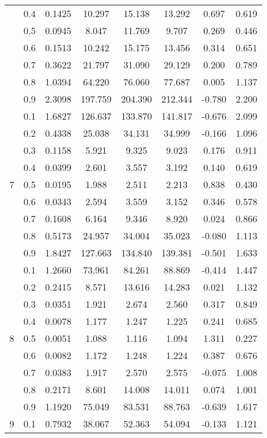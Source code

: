 \documentclass[11pt,a4paper]{report}
\begin{document}
\begin{longtable}{ | c | c || c | c | c | c | c | c | }
 & 0.4 & 0.1425 & 10.297 & 15.138 & 13.292 & 0.697 & 0.619 \\
 & 0.5 & 0.0945 & 8.047 & 11.769 & 9.707 & 0.269 & 0.446 \\
 & 0.6 & 0.1513 & 10.242 & 15.175 & 13.456 & 0.314 & 0.651 \\
 & 0.7 & 0.3622 & 21.797 & 31.090 & 29.129 & 0.200 & 0.789 \\
 & 0.8 & 1.0394 & 64.220 & 76.060 & 77.687 & 0.005 & 1.137 \\
 & 0.9 & 2.3098 & 197.759 & 204.390 & 212.344 & -0.780 & 2.200 \\
 \hline
\multirow{9}{*}{7} & 0.1 & 1.6827 & 126.637 & 133.870 & 141.817 & -0.676 & 2.099 \\
 & 0.2 & 0.4338 & 25.038 & 34.131 & 34.999 & -0.166 & 1.096 \\
 & 0.3 & 0.1158 & 5.921 & 9.325 & 9.023 & 0.176 & 0.911 \\
 & 0.4 & 0.0399 & 2.601 & 3.557 & 3.192 & 0.140 & 0.619 \\
 & 0.5 & 0.0195 & 1.988 & 2.511 & 2.213 & 0.838 & 0.430 \\
 & 0.6 & 0.0343 & 2.594 & 3.559 & 3.152 & 0.346 & 0.578 \\
 & 0.7 & 0.1608 & 6.164 & 9.346 & 8.920 & 0.024 & 0.866 \\
 & 0.8 & 0.5173 & 24.957 & 34.004 & 35.023 & -0.080 & 1.113 \\
 & 0.9 & 1.8427 & 127.663 & 134.840 & 139.381 & -0.501 & 1.633 \\
 \hline
\multirow{9}{*}{8} & 0.1 & 1.2660 & 73.961 & 84.261 & 88.869 & -0.414 & 1.447 \\
 & 0.2 & 0.2415 & 8.571 & 13.616 & 14.283 & 0.021 & 1.132 \\
 & 0.3 & 0.0351 & 1.921 & 2.674 & 2.560 & 0.317 & 0.849 \\
 & 0.4 & 0.0078 & 1.177 & 1.247 & 1.225 & 0.241 & 0.685 \\
 & 0.5 & 0.0051 & 1.088 & 1.116 & 1.094 & 1.311 & 0.227 \\
 & 0.6 & 0.0082 & 1.172 & 1.248 & 1.224 & 0.387 & 0.676 \\
 & 0.7 & 0.0383 & 1.917 & 2.570 & 2.575 & -0.075 & 1.008 \\
 & 0.8 & 0.2171 & 8.601 & 14.008 & 14.011 & 0.074 & 1.001 \\
 & 0.9 & 1.1920 & 75.049 & 83.531 & 88.763 & -0.639 & 1.617 \\
 \hline
\multirow{9}{*}{9} & 0.1 & 0.7932 & 38.067 & 52.363 & 54.094 & -0.133 & 1.121 \\

\end{longtable}
\end{document}
